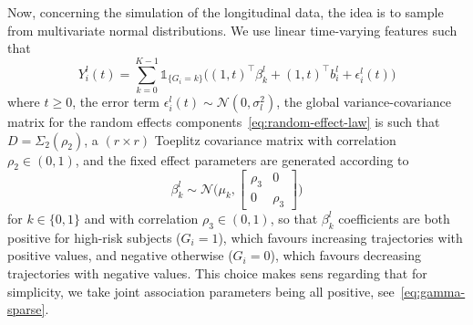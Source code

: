 \documentclass[11pt]{article}
\newcommand{\ind}[1]{\mathds{1}_{#1}}
\newcommand{\cN}{\mathcal N}
\newcommand{\bSigma}{\textbf{$\Sigma$}}
\begin{document}
Now, concerning the simulation of the longitudinal data, the idea is to sample from multivariate normal distributions. 
We use linear time-varying features such that
\[ Y_i^l(t) = \sum_{k=0}^{K-1} \ind{\{G_i=k\}} \big( (1, t)^\top \beta_k^l + (1, t)^\top b_i^l + \epsilon_i^l(t) \big) \]
where $t \geq 0$, the error term $\epsilon_i^l(t) \sim \cN(0, \sigma_l^2)$, the global variance-covariance matrix for the random effects components~\eqref{eq:random-effect-law} is such that $D = \bSigma_2(\rho_2)$, a $(r \times r)$ Toeplitz covariance matrix with correlation $\rho_2 \in (0, 1)$, and the fixed effect parameters are generated according to 
\[ \beta_k^l \sim \cN\Big( 
\mu_k, 
\begin{bmatrix}
  \rho_3 & 0\\
  0 & \rho_3
\end{bmatrix} 
\Big) \]
for $k \in \{0, 1\}$ and with correlation $\rho_3 \in (0, 1)$, so that $\beta_k^l$ coefficients are both positive for high-risk subjects ($G_i=1$), which favours increasing trajectories with positive values, and negative otherwise ($G_i=0$), which favours decreasing trajectories with negative values. This choice makes sens regarding that for simplicity, we take joint association parameters being all positive, see~\eqref{eq:gamma-sparse}.
\end{document}
